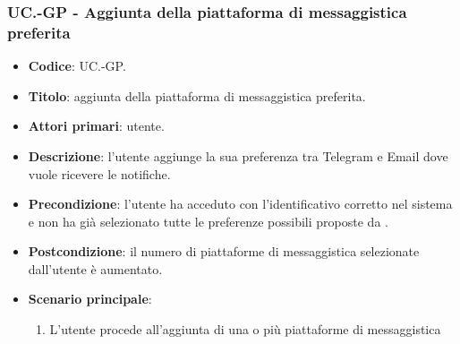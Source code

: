 	\subsubsection{UC\theuccount.\thesubuccount-GP - Aggiunta della piattaforma di messaggistica preferita}

		\begin{itemize}
			\item \textbf{Codice}: UC\theuccount.\thesubuccount-GP.
			\item \textbf{Titolo}: aggiunta della piattaforma di messaggistica preferita.
			\item \textbf{Attori primari}: utente.
			\item \textbf{Descrizione}: l’utente aggiunge la sua preferenza tra Telegram e Email dove vuole ricevere le notifiche.
			\item \textbf{Precondizione}: l'utente ha acceduto con l'identificativo corretto nel sistema e non ha già selezionato tutte le preferenze possibili proposte da \progetto.
			\item \textbf{Postcondizione}: il numero di piattaforme di messaggistica selezionate dall’utente è aumentato.
			\item \textbf{Scenario principale}:
			\begin{enumerate}
				\item L'utente procede all'aggiunta di una o più piattaforme di messaggistica
			\end{enumerate}
		\end{itemize}


